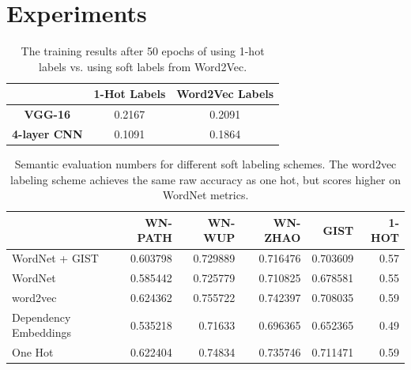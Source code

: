 \section{Experiments}

\begin{table}[!tb]
  \centering
  \begin{tabular}{|c|c|c|}
    \hline
      & \textbf{1-Hot Labels} & \textbf{Word2Vec Labels} \\
    \hline
      \textbf{VGG-16} & 0.2167 & 0.2091 \\
    \hline
      \textbf{4-layer CNN} & 0.1091 & 0.1864 \\
    \hline
  \end{tabular}
  \caption{
    The training results after 50 epochs of using 1-hot labels vs. using soft
    labels from Word2Vec.
  }
  \label{tbl:results}
\end{table}

\begin{table}[t]
    \centering
    \begin{tabular}{lrrrrr}
         & WN-PATH & WN-WUP & WN-ZHAO & GIST & 1-HOT\\
        \hline
        WordNet + GIST & 0.603798 & 0.729889 & 0.716476 & 0.703609 & 0.57\\
        WordNet & 0.585442 & 0.725779 & 0.710825 & 0.678581 & 0.55\\
        word2vec & 0.624362 & 0.755722 & 0.742397 & 0.708035 & 0.59\\
        Dependency Embeddings & 0.535218 & 0.71633 & 0.696365 & 0.652365 &
        0.49\\
        One Hot & 0.622404 & 0.74834 & 0.735746 & 0.711471 & 0.59\\
    \end{tabular}
    \caption{
        Semantic evaluation numbers for different soft labeling schemes. The
        word2vec labeling scheme achieves the same raw accuracy as one hot, but
        scores higher on WordNet metrics.
    }
  \label{tbl:semantic_eval}
\end{table}


